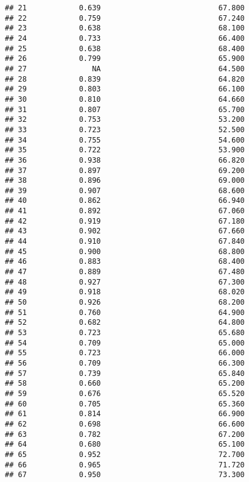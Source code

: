 \documentclass[
]{article}
\begin{document}
\begin{verbatim}
## 21            0.639                           67.800
## 22            0.759                           67.240
## 23            0.638                           68.100
## 24            0.733                           66.400
## 25            0.638                           68.400
## 26            0.799                           65.900
## 27               NA                           64.500
## 28            0.839                           64.820
## 29            0.803                           66.100
## 30            0.810                           64.660
## 31            0.807                           65.700
## 32            0.753                           53.200
## 33            0.723                           52.500
## 34            0.755                           54.600
## 35            0.722                           53.900
## 36            0.938                           66.820
## 37            0.897                           69.200
## 38            0.896                           69.000
## 39            0.907                           68.600
## 40            0.862                           66.940
## 41            0.892                           67.060
## 42            0.919                           67.180
## 43            0.902                           67.660
## 44            0.910                           67.840
## 45            0.900                           68.800
## 46            0.883                           68.400
## 47            0.889                           67.480
## 48            0.927                           67.300
## 49            0.918                           68.020
## 50            0.926                           68.200
## 51            0.760                           64.900
## 52            0.682                           64.800
## 53            0.723                           65.680
## 54            0.709                           65.000
## 55            0.723                           66.000
## 56            0.709                           66.300
## 57            0.739                           65.840
## 58            0.660                           65.200
## 59            0.676                           65.520
## 60            0.705                           65.360
## 61            0.814                           66.900
## 62            0.698                           66.600
## 63            0.782                           67.200
## 64            0.680                           65.100
## 65            0.952                           72.700
## 66            0.965                           71.720
## 67            0.950                           73.300

\end{verbatim}
\end{document}
